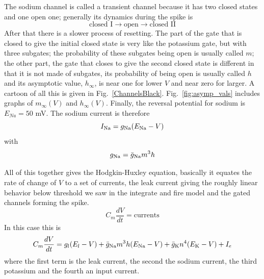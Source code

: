 \documentclass[12pt]{article}
\begin{document}
The sodium channel is called a transient channel because it has two
closed states and one open one; generally its dynamics during the
spike is
\begin{equation}
\mbox{closed I}\rightarrow \mbox{open}\rightarrow\mbox{closed II}
\end{equation}
After that there is a slower process of resetting. The part of the
gate that is closed to give the initial closed state is very like the
potassium gate, but with three subgates; the probability of these
subgates being open is usually called $m$; the other part, the gate
that closes to give the second closed state is different in that it is
not made of subgates, its probability of being open is usually called
$h$ and its asymptotic value, $h_\infty$, is near one for lower $V$
and near zero for larger. A cartoon of all this is given in Fig.~\ref{ChannelsBlack}. Fig.~\ref{fig:asymp_vals} includes graphs of $m_\infty(V)$
and $h_\infty(V)$. Finally, the reversal potential for sodium is
$E_{Na}=50$ mV. The sodium current is therefore
\begin{equation}
I_{\mbox{\scriptsize{Na}}}=g_{\mbox{\scriptsize{Na}}}(E_{\mbox{\scriptsize{Na}}}-V)
\end{equation}
with
\begin{equation}
g_{\mbox{\scriptsize{Na}}}=\bar{g}_{\mbox{\scriptsize{Na}}}m^3h
\end{equation}


All of this together gives the Hodgkin-Huxley equation, basically it
equates the rate of change of $V$ to a set of currents, the leak
current giving the roughly linear behavior below threshold we saw in
the integrate and fire model and the gated channels forming the
spike.
\begin{equation}
C_m\frac{dV}{dt}=\mbox{currents}
\end{equation}
In this case this is
\begin{equation}
C_m\frac{dV}{dt}=g_l(E_l-V)+\bar{g}_{\mbox{\scriptsize{Na}}}m^3h(E_{\mbox{\scriptsize{Na}}}-V)+\bar{g}_{\mbox{\scriptsize{K}}}n^4(E_{\mbox{\scriptsize{K}}}-V)+I_e
\end{equation}
where the first term is the leak current, the second the sodium current, the third potassium and the fourth an input current.
\end{document}
